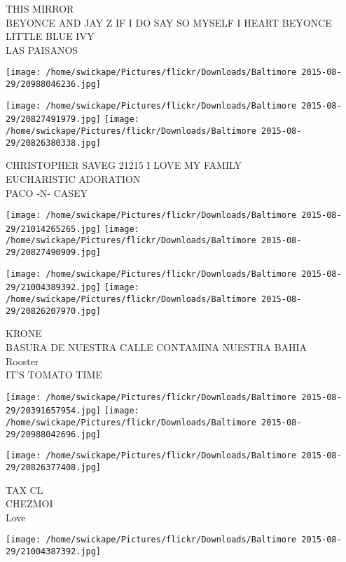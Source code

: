 \documentclass[10pt,letterpaper]{article}
\begin{document}
THIS MIRROR\\
BEYONCE AND JAY Z IF I DO SAY SO MYSELF I HEART BEYONCE LITTLE BLUE IVY\\
LAS PAISANOS\\
\pagebreak

\texttt{[image: /home/swickape/Pictures/flickr/Downloads/Baltimore 2015-08-29/20988046236.jpg]}

\vspace{0.25in}
\texttt{[image: /home/swickape/Pictures/flickr/Downloads/Baltimore 2015-08-29/20827491979.jpg]}
\texttt{[image: /home/swickape/Pictures/flickr/Downloads/Baltimore 2015-08-29/20826380338.jpg]}

CHRISTOPHER SAVEG 21215 I LOVE MY FAMILY\\
EUCHARISTIC ADORATION\\
PACO {-}N{-} CASEY\\
\pagebreak

\texttt{[image: /home/swickape/Pictures/flickr/Downloads/Baltimore 2015-08-29/21014265265.jpg]}
\texttt{[image: /home/swickape/Pictures/flickr/Downloads/Baltimore 2015-08-29/20827490909.jpg]}

\texttt{[image: /home/swickape/Pictures/flickr/Downloads/Baltimore 2015-08-29/21004389392.jpg]}
\texttt{[image: /home/swickape/Pictures/flickr/Downloads/Baltimore 2015-08-29/20826207970.jpg]}

KRONE\\
BASURA DE NUESTRA CALLE CONTAMINA NUESTRA BAHIA\\
Rooster\\
IT'S TOMATO TIME\\
\pagebreak

\texttt{[image: /home/swickape/Pictures/flickr/Downloads/Baltimore 2015-08-29/20391657954.jpg]}
\texttt{[image: /home/swickape/Pictures/flickr/Downloads/Baltimore 2015-08-29/20988042696.jpg]}

\texttt{[image: /home/swickape/Pictures/flickr/Downloads/Baltimore 2015-08-29/20826377408.jpg]}

TAX CL\\
CHEZMOI\\
Love\\
\pagebreak

\texttt{[image: /home/swickape/Pictures/flickr/Downloads/Baltimore 2015-08-29/21004387392.jpg]}
\end{document}
